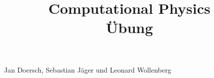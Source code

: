 \documentclass[a4paper, 12pt]{article}
\begin{document}
\title{
\textbf{Computational Physics\\
Übung}
}
\date{}
\maketitle

\begin{center}
Jan Doersch, Sebastian Jäger und Leonard Wollenberg
\end{center}




%
\end{document}
